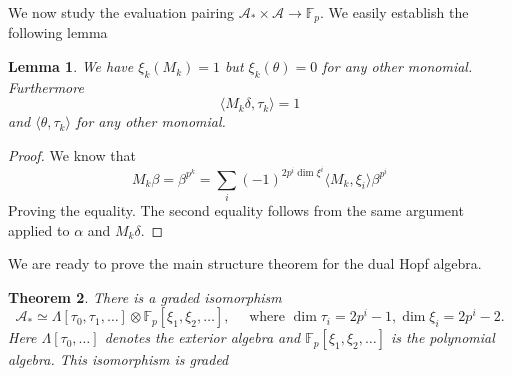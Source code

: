 \documentclass[11pt, a4paper]{article}
\newtheorem{thm}{Theorem}
\newtheorem{lemma}[thm]{Lemma}
\theoremstyle{plain}
\newtheorem*{proof}{Proof}
\begin{document}
We now study the evaluation pairing $\mathcal{A}_\ast\times \mathcal{A} \to \mathbb{F}_p$. We easily establish the following lemma
\begin{lemma}
We have $\xi_k ( M_k) =1$ but $\xi_k( \theta)=0 $ for any other monomial.\\
Furthermore
\[ 
\langle M_k \delta, \tau_k \rangle = 1
\]
and $\langle \theta, \tau_k\rangle$ for any other monomial.
\end{lemma}
\begin{proof}
We know that
\[ 
M_k \beta = \beta^{p^{k}}= \sum_i ( -1)^{2 p^{i}\dim \xi^{i}} \langle M_k, \xi_i\rangle \beta^{p^{i}}
\]
Proving the equality. The second equality follows from the same argument applied to $\alpha$ and $M_k\delta$.
\end{proof}
We are ready to prove the main structure theorem for the dual Hopf algebra.
\begin{thm}
	There is a graded isomorphism
	\[ 
		\mathcal{A}_\ast \simeq \Lambda [ \tau_0,\tau_1,\ldots] \otimes \mathbb{F}_p[\xi_1,\xi_2,\ldots], \quad \text{ where } \dim \tau_i = 2p^{i}-1 , \dim \xi_i = 2p^{i}-2.
	\]
	Here $\Lambda[\tau_0,\ldots]$ denotes the exterior algebra and $\mathbb{F}_p[\xi_1,\xi_2,\ldots]$ is the polynomial algebra. This isomorphism is graded 

\end{thm}
\end{document}

